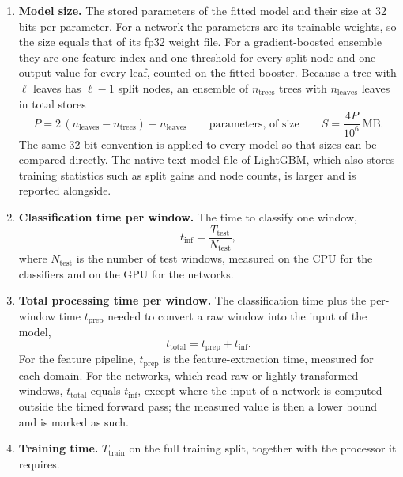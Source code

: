 \begin{enumerate}[label=(\roman*), leftmargin=*, itemsep=3pt]
	\item \textbf{Model size.} The stored parameters of the fitted model and their size at 32 bits per parameter. For a network the parameters are its trainable weights, so the size equals that of its fp32 weight file. For a gradient-boosted ensemble they are one feature index and one threshold for every split node and one output value for every leaf, counted on the fitted booster. Because a tree with $\ell$ leaves has $\ell - 1$ split nodes, an ensemble of $n_{\mathrm{trees}}$ trees with $n_{\mathrm{leaves}}$ leaves in total stores
	\begin{equation}
		P = 2\,(n_{\mathrm{leaves}} - n_{\mathrm{trees}}) + n_{\mathrm{leaves}}
		\qquad \text{parameters, of size} \qquad
		S = \frac{4P}{10^{6}}\ \mathrm{MB}.
		\label{eq:modelsize}
	\end{equation}
	The same 32-bit convention is applied to every model so that sizes can be compared directly. The native text model file of LightGBM, which also stores training statistics such as split gains and node counts, is larger and is reported alongside.
	\item \textbf{Classification time per window.} The time to classify one window,
	\begin{equation}
		t_{\mathrm{inf}} = \frac{T_{\mathrm{test}}}{N_{\mathrm{test}}},
		\label{eq:inference}
	\end{equation}
	where $N_{\mathrm{test}}$ is the number of test windows, measured on the CPU for the classifiers and on the GPU for the networks.
	\item \textbf{Total processing time per window.} The classification time plus the per-window time $t_{\mathrm{prep}}$ needed to convert a raw window into the input of the model,
	\begin{equation}
		t_{\mathrm{total}} = t_{\mathrm{prep}} + t_{\mathrm{inf}}.
		\label{eq:totaltime}
	\end{equation}
	For the feature pipeline, $t_{\mathrm{prep}}$ is the feature-extraction time, measured for each domain. For the networks, which read raw or lightly transformed windows, $t_{\mathrm{total}}$ equals $t_{\mathrm{inf}}$, except where the input of a network is computed outside the timed forward pass; the measured value is then a lower bound and is marked as such.
	\item \textbf{Training time.} $T_{\mathrm{train}}$ on the full training split, together with the processor it requires.
\end{enumerate}
